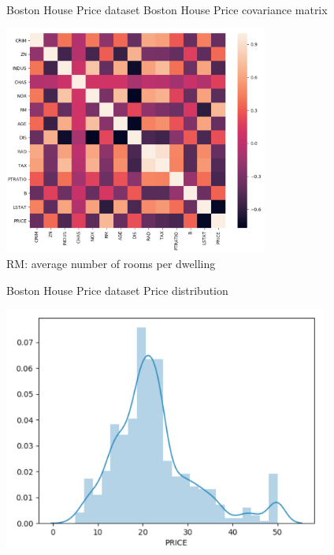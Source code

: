 \documentclass{beamer}
\begin{document}
\begin{frame}{Boston House Price dataset}
Boston House Price covariance matrix\\
\begin{center}
\includegraphics[width=0.65\textwidth]{boston_house_price_correlation}\\
RM: average number of rooms per dwelling
\end{center}
\end{frame}

\begin{frame}{Boston House Price dataset}
Price distribution\\
\begin{center}
\includegraphics[width=0.80\textwidth]{boston_distr}\\
\end{center}
\end{frame}
\end{document}
